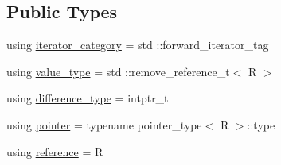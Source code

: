 \subsection*{Public Types}
\begin{DoxyCompactItemize}
\item 
using \mbox{\hyperlink{structrah_1_1iterator__facade_3_01_i_00_01_r_00_01std_01_1_1forward__iterator__tag_01_4_a3c1278be55ca5af439eb79e2ee9a3c49}{iterator\+\_\+category}} = std \+::forward\+\_\+iterator\+\_\+tag
\item 
using \mbox{\hyperlink{structrah_1_1iterator__facade_3_01_i_00_01_r_00_01std_01_1_1forward__iterator__tag_01_4_a382051259e4c6ce57365cbdd02e6536e}{value\+\_\+type}} = std \+::remove\+\_\+reference\+\_\+t$<$ R $>$
\item 
using \mbox{\hyperlink{structrah_1_1iterator__facade_3_01_i_00_01_r_00_01std_01_1_1forward__iterator__tag_01_4_abc2f97747157d90d76075b0df9a236f0}{difference\+\_\+type}} = intptr\+\_\+t
\item 
using \mbox{\hyperlink{structrah_1_1iterator__facade_3_01_i_00_01_r_00_01std_01_1_1forward__iterator__tag_01_4_a341d48f3cb5b1df5da4ee7b7bc77a4c2}{pointer}} = typename pointer\+\_\+type$<$ R $>$\+::type
\item 
using \mbox{\hyperlink{structrah_1_1iterator__facade_3_01_i_00_01_r_00_01std_01_1_1forward__iterator__tag_01_4_afc82a925c7d3fa3959bc9e8fc96dc582}{reference}} = R
\end{DoxyCompactItemize}
